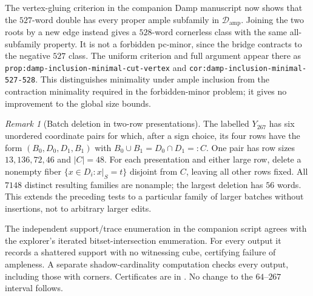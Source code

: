 \documentclass[11pt]{article}
\numberwithin{equation}{section}
\theoremstyle{definition}
\theoremstyle{remark}
\newtheorem{remark}[theorem]{Remark}
\newcommand{\Damp}{\mathcal D_{\mathrm{amp}}}
\begin{document}
The vertex-gluing criterion in the companion Damp manuscript now shows
that the $527$-word double has every proper ample subfamily in $\Damp$.
Joining the two roots by a new edge instead gives a $528$-word cornerless
class with the same all-subfamily property. It is not a forbidden pc-minor,
since the bridge contracts to the negative $527$ class. The uniform
criterion and full argument appear there as
\texttt{prop:damp-inclusion-minimal-cut-vertex} and
\texttt{cor:damp-inclusion-minimal-527-528}. This distinguishes minimality
under ample inclusion from the contraction minimality required in the
forbidden-minor problem; it gives no improvement to the global size bounds.

\begin{remark}[Batch deletion in two-row presentations]
\label{rem:record-two-row-fiber-deletions}
The labelled $Y_{267}$ has six unordered coordinate pairs for which,
after a sign choice, its four rows have the form
$(B_0,D_0,D_1,B_1)$ with $B_0\cup B_1=D_0\cap D_1=:C$.
One pair has row sizes $13,136,72,46$ and $|C|=48$.
For each presentation and either large row, delete a nonempty fiber
$\{x\in D_i:x|_S=t\}$ disjoint from $C$, leaving all other rows fixed.
All $7148$ distinct resulting families are nonample; the largest deletion
has $56$ words. This extends the preceding tests to a particular family
of larger batches without insertions, not to arbitrary larger edits.

The independent support/trace enumeration in the companion script
 agrees with the
explorer's iterated bitset-intersection enumeration. For every output it
records a shattered support with no witnessing cube, certifying failure
of ampleness. A separate shadow-cardinality computation checks every
output, including those with corners. Certificates are in
.
No change to the $64$--$267$ interval follows.
\end{remark}
\end{document}

